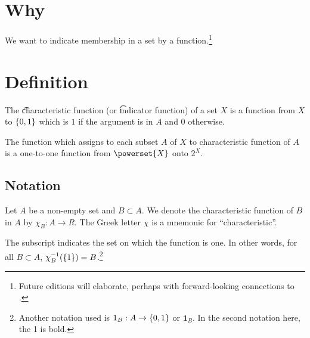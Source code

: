 
\section*{Why}

We want to indicate membership in a set by a function.\footnote{Future editions will elaborate, perhaps with forward-looking connections to .}

\section*{Definition}

The \t{characteristic function} (or \t{indicator function}) of a set $X$ is a function from $X$ to $\{0,1\}$ which is $1$ if the argument is in $A$ and 0 otherwise.

The function which assigns to each subset $A$ of $X$ to characteristic function of $A$ is a one-to-one function from $\powerset{X}$ onto $2^{X}$.

\subsection*{Notation}

Let $A$ be a non-empty set and $B \subset A$.
We denote the characteristic function of $B$ in $A$ by $\chi _{B}: A \to R$.
The Greek letter $\chi $ is a mnemonic for ``characteristic''.

The subscript indicates the set on which the function is one.
In other words, for all $B \subset A$, $\chi _{B}^{-1}(\{1\}) = B$.\footnote{Another notation used is $1_{B}: A \to \{0, 1\}$ or $\mathbf{1}_B$.
In the second notation here, the 1 is bold.}

\blankpage